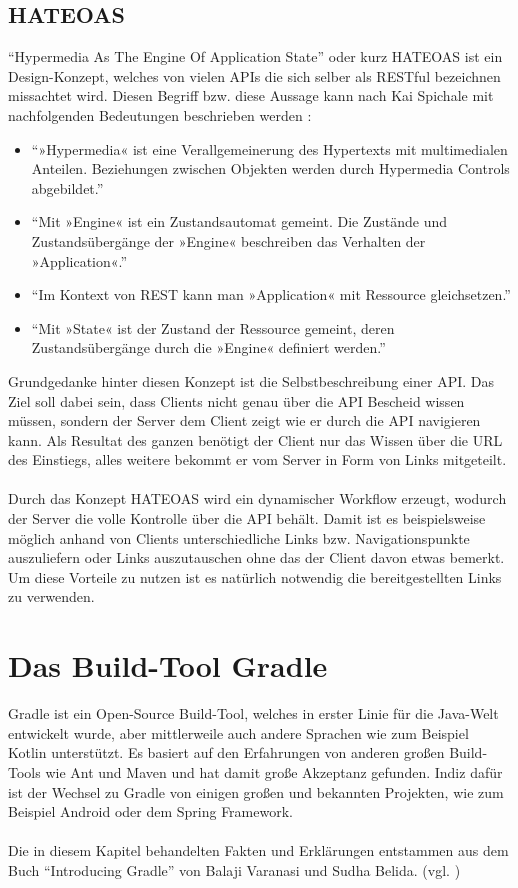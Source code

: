 \subsection{HATEOAS}
\enquote{Hypermedia As The Engine Of Application State} oder kurz HATEOAS ist ein Design-Konzept, welches von vielen \glspl{API} die sich selber als \gls{REST}ful bezeichnen missachtet wird. Diesen Begriff bzw. diese Aussage kann nach Kai Spichale mit nachfolgenden Bedeutungen beschrieben werden \cite[156]{apiDesign}:
\begin{itemize}
	\item \enquote{»Hypermedia« ist eine Verallgemeinerung des Hypertexts mit multimedialen Anteilen. Beziehungen zwischen Objekten werden durch
		Hypermedia Controls abgebildet.}
	\item \enquote{Mit »Engine« ist ein Zustandsautomat gemeint. Die Zustände und
		Zustandsübergänge der »Engine« beschreiben das Verhalten der
		»Application«.}
	\item \enquote{Im Kontext von REST kann man »Application« mit Ressource
		gleichsetzen.}
	\item \enquote{Mit »State« ist der Zustand der Ressource gemeint, deren Zustandsübergänge durch die »Engine« definiert werden.}
\end{itemize}
Grundgedanke hinter diesen Konzept ist die Selbstbeschreibung einer \gls{API}. Das Ziel soll dabei sein, dass Clients nicht genau über die \gls{API} Bescheid wissen müssen, sondern der Server dem Client zeigt wie er durch die \gls{API} navigieren kann. Als Resultat des ganzen benötigt der Client nur das Wissen über die \gls{URL} des Einstiegs, alles weitere bekommt er vom Server in Form von Links mitgeteilt. \\
\\
Durch das Konzept HATEOAS wird ein dynamischer Workflow erzeugt, wodurch der Server die volle Kontrolle über die \gls{API} behält. Damit ist es beispielsweise möglich anhand von Clients unterschiedliche Links bzw. Navigationspunkte auszuliefern oder Links auszutauschen ohne das der Client davon etwas bemerkt. Um diese Vorteile zu nutzen ist es natürlich notwendig die bereitgestellten Links zu verwenden.

\section{Das Build-Tool Gradle}
Gradle ist ein Open-Source Build-Tool, welches in erster Linie für die Java-Welt entwickelt wurde, aber mittlerweile auch andere Sprachen wie zum Beispiel Kotlin unterstützt. Es basiert auf den Erfahrungen von anderen großen Build-Tools wie Ant und Maven und hat damit große Akzeptanz gefunden. Indiz dafür ist der Wechsel zu Gradle von einigen großen und bekannten Projekten, wie zum Beispiel Android oder dem Spring Framework.\\
\\
Die in diesem Kapitel behandelten Fakten und Erklärungen entstammen aus dem Buch \enquote{Introducing Gradle} von Balaji Varanasi und Sudha Belida. (vgl. \cite{introducingGradle})

